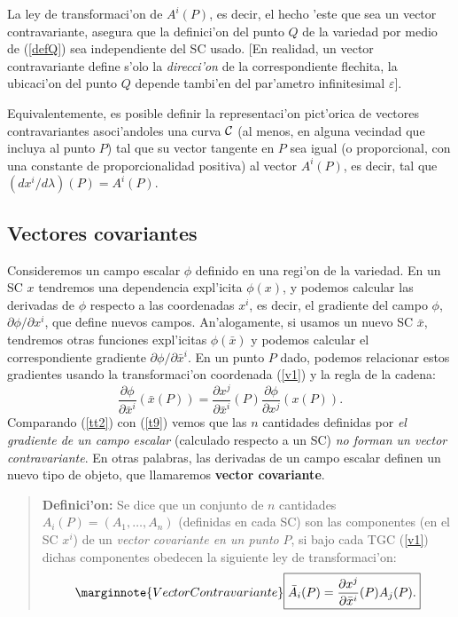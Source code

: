 La ley de transformaci'on de $A^i(P)$, es decir, el hecho 'este que sea un vector contravariante, asegura que la definici'on del punto $Q$ de la variedad por medio de (\ref{defQ}) sea independiente del SC usado. [En realidad, un vector contravariante define s'olo la \textit{direcci'on} de la correspondiente flechita, la ubicaci'on del punto $Q$ depende tambi'en del par'ametro infinitesimal $\varepsilon$].

Equivalentemente, es posible definir la representaci'on pict'orica de vectores contravariantes asoci'andoles una curva $\cal C$ (al menos, en alguna vecindad que incluya al punto $P$) tal que su vector tangente en $P$ sea igual (o proporcional, con una constante de proporcionalidad positiva) al vector $A^i(P)$, es decir, tal que $(dx^i/d\lambda)(P)=A^i(P)$.

\subsection{Vectores covariantes}

Consideremos un campo escalar $\phi$ definido en una regi'on de la variedad. En
un SC $x$ tendremos una dependencia expl'icita $\phi(x)$, y podemos calcular
las derivadas de $\phi$ respecto a las coordenadas $x^i$, es decir, el gradiente
del campo $\phi$, ${\partial \phi}/{\partial x^i}$, que define nuevos
campos. An'alogamente, si usamos un nuevo SC $\bar{x}$, tendremos otras
funciones expl'icitas $\phi(\bar{x})$ y podemos calcular el correspondiente
gradiente ${\partial \phi}/{\partial \bar{x}^i}$. En un punto $P$ dado,
podemos relacionar estos gradientes usando la transformaci'on coordenada
(\ref{v1}) y la regla de la cadena:
\begin{equation}
\boxed{\frac{\partial\phi}{\partial \bar{x}^i }(\bar{x}(P))=\frac{\partial x^j
}{\partial\bar{x}^i }(P)\frac{\partial\phi}{\partial x^j }(x(P)).} \label{tt2}
\end{equation}
Comparando (\ref{tt2}) con (\ref{t9}) vemos que las $n$ cantidades definidas por
\textit{el gradiente de un campo escalar} (calculado respecto a un SC) \textit{no forman
un vector contravariante}. En otras palabras, las derivadas de un campo escalar definen un nuevo tipo de objeto, que llamaremos \textbf{vector covariante}.

\begin{quotation}
\textbf{Definici'on:} Se dice que un conjunto de $n$ cantidades $A_i(P)=(A_1,\dots
,A_n)$ (definidas en cada SC) son las componentes (en el SC $x^i$) de un \textit{vector covariante en un punto} $P$, si bajo cada TGC (\ref{v1}) dichas componentes obedecen la siguiente ley de transformaci'on:
\begin{equation}\marginnote{Vector Contravariante}
\boxed{\bar{A}_i(P)=\frac{\partial x^j}{\partial\bar{x}^i}(P)A_j(P).}
\label{t6}
\end{equation}
\end{quotation}

